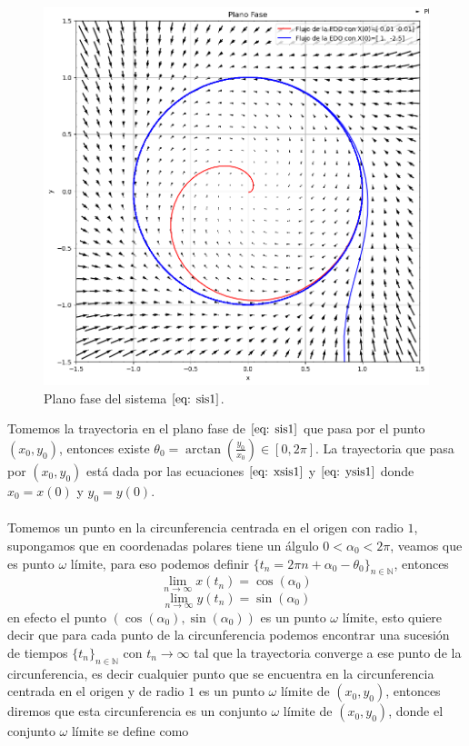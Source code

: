 \documentclass[12pt, a4paper]{report}
\begin{document}
\begin{figure}[h]
	\centering
	\includegraphics[width=13cm]{planofase1.png}
	\caption{Plano fase del sistema $\eqref{eq: sis1}$.}
\end{figure}

Tomemos la trayectoria en el plano fase de $\eqref{eq: sis1}$ que pasa por el punto
$(x_0,y_0)$, entonces existe $\theta_0=\arctan(\frac{y_0}{x_0})\in[0,2\pi]$.
La trayectoria que pasa por $(x_0,y_0)$ está dada por las ecuaciones $\eqref{eq: xsis1}$ y
$\eqref{eq: ysis1}$ donde $x_0=x(0)$ y $y_0=y(0)$.\\
\\Tomemos un punto en la circunferencia centrada en el origen con radio $1$,
supongamos que
en coordenadas polares tiene un álgulo $0<\alpha_0<2\pi$, veamos que es punto $\omega$ límite, para eso podemos definir
$\{t_n=2\pi n+\alpha_0-\theta_0\}_{n\in \mathbb{N}}$, entonces
$$\lim_{n\to\infty}x(t_n)=\cos(\alpha_0)$$
$$\lim_{n\to\infty}y(t_n)=\sin(\alpha_0)$$
en efecto el punto $(\cos(\alpha_0),\sin(\alpha_0))$ es un punto $\omega$ límite, esto
quiere decir que para cada punto de la circunferencia podemos encontrar
una sucesión de tiempos $\{t_n\}_{n\in \mathbb{N}}$ con $t_n\to\infty$ tal que la
trayectoria converge a ese punto de la circunferencia, es decir cualquier punto que se encuentra en la
circunferencia centrada en el origen y de radio $1$ es un punto $\omega$ límite de $(x_0,y_0)$,
entonces diremos que esta circunferencia es un conjunto $\omega$ límite de $(x_0,y_0)$, donde 
el conjunto $\omega$ límite se define como 
\end{document}

